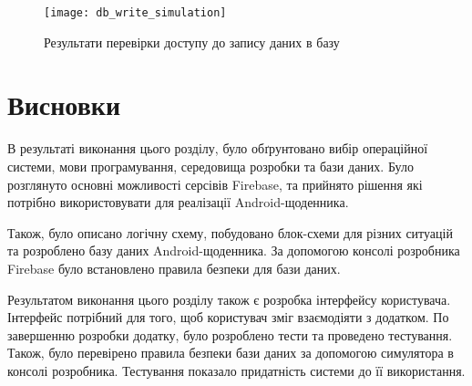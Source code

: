 \documentclass[../main.tex]{subfiles}
\begin{document}
\begin{figure}[H]
	\centering
	\texttt{[image: db\_write\_simulation]}
	\caption{Результати перевірки доступу до запису даних в базу}
	\label{figure:db_write_simulation}
\end{figure}

\section{Висновки}

В результаті виконання цього розділу, було обґрунтовано вибір операційної системи, мови програмування, середовища розробки та бази даних. Було розглянуто основні можливості серсівів Firebase, та прийнято рішення які потрібно використовувати для реалізації Android-щоденника.

	
Також, було описано логічну схему, побудовано блок-схеми для різних ситуацій та розроблено базу даних Android-щоденника. За допомогою консолі розробника Firebase було встановлено правила безпеки для бази даних. 

Результатом виконання цього розділу також є розробка інтерфейсу користувача. Інтерфейс потрібний для того, щоб користувач зміг взаємодіяти з додатком. По завершенню розробки додатку, було розроблено тести та проведено тестування. Також, було перевірено правила безпеки бази даних за допомогою симулятора в консолі розробника. Тестування показало придатність системи до її використання.
	
\end{document}
